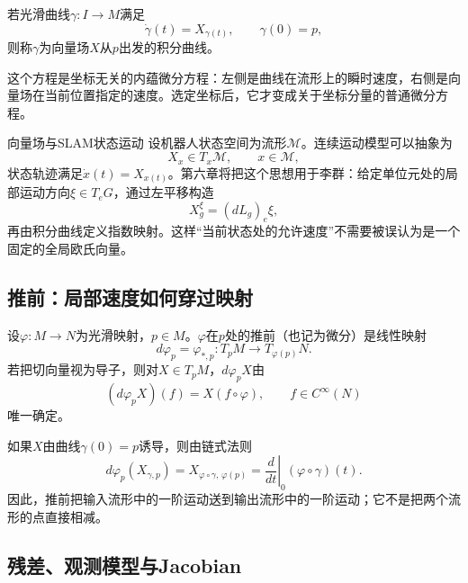\begin{definition}[积分曲线]
若光滑曲线$\gamma:I\to M$满足
\[
    \dot\gamma(t)=X_{\gamma(t)},
    \qquad \gamma(0)=p,
\]
则称$\gamma$为向量场$X$从$p$出发的积分曲线。
\end{definition}

这个方程是坐标无关的内蕴微分方程：左侧是曲线在流形上的瞬时速度，右侧是向量场在当前位置指定的速度。选定坐标后，它才变成关于坐标分量的普通微分方程。

\begin{slamcase}{向量场与SLAM状态运动}
设机器人状态空间为流形$\mathcal M$。连续运动模型可以抽象为
\[
    X_x\in T_x\mathcal M,
    \qquad x\in\mathcal M,
\]
状态轨迹满足$\dot x(t)=X_{x(t)}$。第六章将把这个思想用于李群：给定单位元处的局部运动方向$\xi\in T_eG$，通过左平移构造
\[
    X_g^\xi=(dL_g)_e\xi,
\]
再由积分曲线定义指数映射。这样“当前状态处的允许速度”不需要被误认为是一个固定的全局欧氏向量。
\end{slamcase}

\subsection{推前：局部速度如何穿过映射}

\begin{definition}[推前]
设$\varphi:M\to N$为光滑映射，$p\in M$。$\varphi$在$p$处的推前（也记为微分）是线性映射
\[
    d\varphi_p=\varphi_{\ast,p}:T_pM\to T_{\varphi(p)}N.
\]
若把切向量视为导子，则对$X\in T_pM$，$d\varphi_pX$由
\[
    (d\varphi_pX)(f)=X(f\circ\varphi),
    \qquad f\in C^\infty(N)
\]
唯一确定。
\end{definition}

如果$X$由曲线$\gamma(0)=p$诱导，则由链式法则
\[
    d\varphi_p(X_{\gamma,p})
    =X_{\varphi\circ\gamma,\,\varphi(p)}
    =\left.\frac{d}{dt}\right|_{0}(\varphi\circ\gamma)(t).
\]
因此，推前把输入流形中的一阶运动送到输出流形中的一阶运动；它不是把两个流形的点直接相减。

\begin{center}
\end{center}

\subsection{残差、观测模型与Jacobian}

